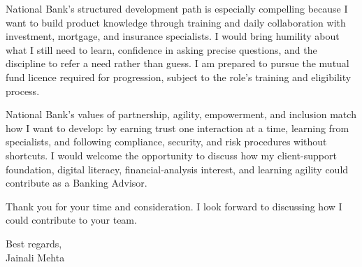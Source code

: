 \documentclass[letterpaper,11pt]{article}
\begin{document}
\bigbreak
National Bank's structured development path is especially compelling because I want to build product knowledge through training and daily collaboration with investment, mortgage, and insurance specialists. I would bring humility about what I still need to learn, confidence in asking precise questions, and the discipline to refer a need rather than guess. I am prepared to pursue the mutual fund licence required for progression, subject to the role's training and eligibility process.

\bigbreak
National Bank's values of partnership, agility, empowerment, and inclusion match how I want to develop: by earning trust one interaction at a time, learning from specialists, and following compliance, security, and risk procedures without shortcuts. I would welcome the opportunity to discuss how my client-support foundation, digital literacy, financial-analysis interest, and learning agility could contribute as a Banking Advisor.

\bigbreak
Thank you for your time and consideration. I look forward to discussing how I could contribute to your team.

\bigbreak
Best regards,\\
Jainali Mehta
\end{document}
